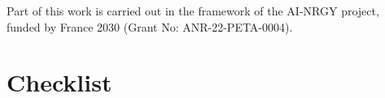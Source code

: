 \documentclass{article}
\begin{document}
Part of this work is carried out in the framework of the AI-NRGY project, funded by France 2030 (Grant No: ANR-22-PETA-0004).




\newpage

\section*{Checklist}

\end{document}
